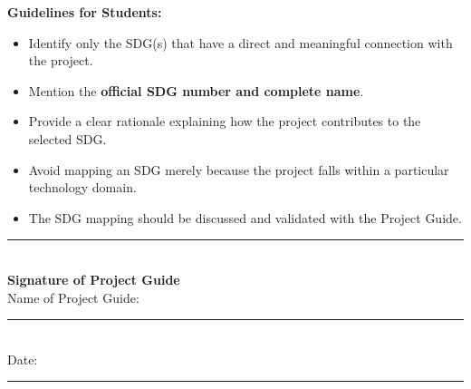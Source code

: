 \vspace{0.5cm}


\noindent
\textbf{Guidelines for Students:}

\begin{itemize}
    \item Identify only the SDG(s) that have a direct and meaningful
    connection with the project.
    
    \item Mention the \textbf{official SDG number and complete name}.
    
    \item Provide a clear rationale explaining how the project
    contributes to the selected SDG.
    
    \item Avoid mapping an SDG merely because the project falls within
    a particular technology domain.
    
    \item The SDG mapping should be discussed and validated with the
    Project Guide.
\end{itemize}

\vspace{1.0cm}


\begin{center}

\rule{6cm}{0.2px}\\
\textbf{Signature of Project Guide}\\[0.4cm]

Name of Project Guide: \rule{5cm}{0.2px}\\[0.4cm]

Date: \rule{3cm}{0.2px}

\end{center}

